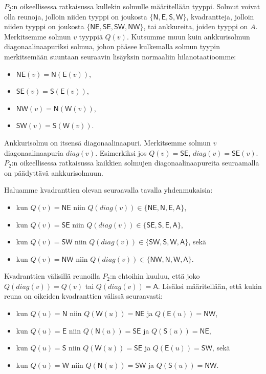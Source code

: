 \documentclass[12pt,finnish]{tktltiki2}
\theoremstyle{definition}
\theoremstyle{remark}
\begin{document}
$P_2$:n oikeellisessa ratkaisussa kullekin solmulle määritellään tyyppi. Solmut voivat olla reunoja, jolloin niiden tyyppi on joukosta $\{\mathsf{N, E, S, W}\}$, kvadrantteja, jolloin niiden tyyppi on joukosta $\{\mathsf{NE, SE, SW, NW}\}$, tai ankkureita, joiden tyyppi on $A$. Merkitsemme solmun $v$ tyyppiä $Q(v)$. Kutsumme muun kuin ankkurisolmun diagonaalinaapuriksi solmua, johon pääsee kulkemalla solmun tyypin merkitsemään suuntaan seuraavin lisäyksin normaaliin hilanotaatioomme:
\begin{itemize}[label={}]
  \item $\mathsf{NE}(v) = \mathsf{N}(\mathsf{E}(v))$,
  \item $\mathsf{SE}(v) = \mathsf{S}(\mathsf{E}(v))$,
  \item $\mathsf{NW}(v) = \mathsf{N}(\mathsf{W}(v))$,
  \item $\mathsf{SW}(v) = \mathsf{S}(\mathsf{W}(v))$.
\end{itemize}
Ankkurisolmu on itsensä diagonaalinaapuri. Merkitsemme solmun $v$ diagonaalinaapuria $diag(v)$. Esimerkiksi jos $Q(v) = \mathsf{SE}$, $diag(v) = \mathsf{SE}(v)$. $P_2$:n oikeellisessa ratkaisussa kaikkien solmujen diagonaalinaapureita seuraamalla on päädyttävä ankkurisolmuun.

Haluamme kvadranttien olevan seuraavalla tavalla yhdenmukaisia:
\begin{itemize}[label={}]
  \item kun $Q(v) = \mathsf{NE}$ niin $Q(diag(v)) \in \{\mathsf{NE}, \mathsf{N}, \mathsf{E}, \mathsf{A}\}$,
  \item kun $Q(v) = \mathsf{SE}$ niin $Q(diag(v)) \in \{\mathsf{SE}, \mathsf{S}, \mathsf{E}, \mathsf{A}\}$,
  \item kun $Q(v) = \mathsf{SW}$ niin $Q(diag(v)) \in \{\mathsf{SW}, \mathsf{S}, \mathsf{W}, \mathsf{A}\}$, sekä
  \item kun $Q(v) = \mathsf{NW}$ niin $Q(diag(v)) \in \{\mathsf{NW}, \mathsf{N}, \mathsf{W}, \mathsf{A}\}$.
\end{itemize}
Kvadranttien välisillä reunoilla $P_2$:n ehtoihin kuuluu, että joko $Q(diag(v)) = Q(v)$ tai $Q(diag(v)) = \mathsf{A}$. Lisäksi määritellään, että kukin reuna on oikeiden kvadranttien välissä seuraavasti:
\begin{itemize}[label={}]
  \item kun $Q(u) = \mathsf{N}$ niin $Q(\mathsf{W}(u)) = \mathsf{NE}$ ja $Q(\mathsf{E}(u)) = \mathsf{NW}$,
  \item kun $Q(u) = \mathsf{E}$ niin $Q(\mathsf{N}(u)) = \mathsf{SE}$ ja $Q(\mathsf{S}(u)) = \mathsf{NE}$,
  \item kun $Q(u) = \mathsf{S}$ niin $Q(\mathsf{W}(u)) = \mathsf{SE}$ ja $Q(\mathsf{E}(u)) = \mathsf{SW}$, sekä
  \item kun $Q(u) = \mathsf{W}$ niin $Q(\mathsf{N}(u)) = \mathsf{SW}$ ja $Q(\mathsf{S}(u)) = \mathsf{NW}$.
\end{itemize}
\end{document}
